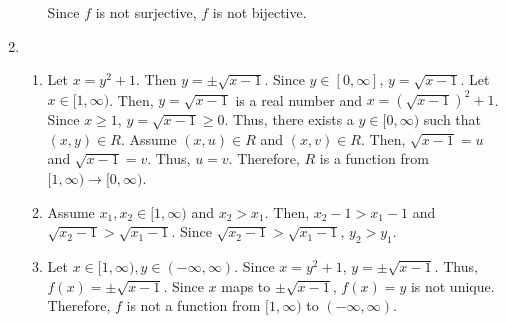 \documentclass[10pt]{exam}
\begin{document}
\begin{enumerate}
\begin{enumerate}
        Since $f$ is not surjective, $f$ is not bijective. 
    \end{enumerate}

    \pagebreak
    \item
    \begin{enumerate}
        \item 
        Let $x = y^2+1$. Then $y = \pm \sqrt{x-1}$. Since $y\in [0, \infty]$, $y = \sqrt{x-1}$. 
        Let $x\in [1, \infty)$. Then, $y = \sqrt{x-1}$ is a real number and $x = (\sqrt{x-1})^2 + 1$.
        Since $x\geq 1$, $y = \sqrt{x-1} \geq 0$. Thus, there exists a $y\in [0, \infty)$ such that $(x, y)\in R$. 
        Assume $(x, u)\in R$ and $(x, v)\in R$. Then, $\sqrt{x-1} = u$ and $\sqrt{x-1} = v$. 
        Thus, $u = v$. Therefore, $R$ is a function from $[1, \infty) \rightarrow [0, \infty)$.

        \item
        Assume $x_1, x_2 \in [1, \infty)$ and $x_2 > x_1$. Then, $x_2-1 > x_1-1$ and 
        $\sqrt{x_2-1} > \sqrt{x_1-1}$. Since $\sqrt{x_2-1} > \sqrt{x_1-1}$, $y_2>y_1$.
        
        \item 
        Let $x\in [1, \infty), y\in (-\infty, \infty)$. Since $x = y^2+1$, $y = \pm \sqrt{x-1}$. 
        Thus, $f(x) = \pm \sqrt{x-1}$. Since $x$ maps to $\pm \sqrt{x-1}$, $f(x) = y$ is not unique. 
        Therefore, $f$ is not a function from $[1, \infty)$ to $(-\infty, \infty)$. 
    \end{enumerate}


\end{enumerate}
\end{document}
